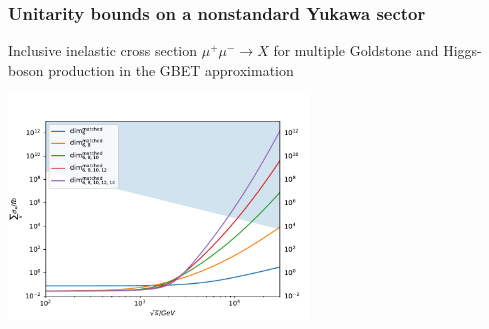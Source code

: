 \documentclass[aspectratio=169]{beamer}
\begin{document}
\begin{frame}
	\frametitle{Unitarity bounds on a nonstandard Yukawa sector}
	Inclusive inelastic cross section $\mu^+\mu^-\to X$ for multiple Goldstone and Higgs-boson production in the GBET approximation
	\vspace{-3mm}
	\begin{center}
	\includegraphics[width=0.6\textwidth]{figs/UnitarityBoundPy}
	\end{center}
\end{frame}
\end{document}
